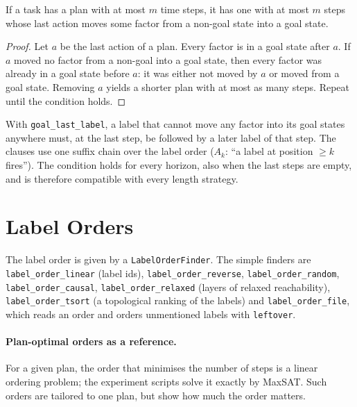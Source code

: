 \documentclass[manuscript, screen]{jair}
\newcommand{\opt}[1]{\texttt{#1}}
\begin{document}
\begin{proposition}
If a task has a plan with at most $m$ time steps, it has one with at most $m$ steps whose last
action moves some factor from a non-goal state into a goal state.
\end{proposition}
\begin{proof}
Let $a$ be the last action of a plan. Every factor is in a goal state after $a$. If $a$ moved no
factor from a non-goal into a goal state, then every factor was already in a goal state before $a$:
it was either not moved by $a$ or moved from a goal state. Removing $a$ yields a shorter plan with
at most as many steps. Repeat until the condition holds.
\end{proof}
With \opt{goal\_last\_label}, a label that cannot move any factor into its goal states anywhere must,
at the last step, be followed by a later label of that step. The clauses use one suffix chain over
the label order ($A_k$: ``a label at position $\geq k$ fires''). The condition holds for every
horizon, also when the last steps are empty, and is therefore compatible with every length strategy.

\section{Label Orders}\label{sec:orders}

The label order is given by a \opt{LabelOrderFinder}. The simple finders are \opt{label\_order\_linear}
(label ids), \opt{label\_order\_reverse}, \opt{label\_order\_random}, \opt{label\_order\_causal},
\opt{label\_order\_relaxed} (layers of relaxed reachability), \opt{label\_order\_tsort} (a topological
ranking of the labels) and \opt{label\_order\_file}, which reads an order
and orders unmentioned labels with \opt{leftover}.

\paragraph{Plan-optimal orders as a reference.} For a given plan, the order that minimises the number
of steps is a linear ordering problem; the experiment scripts solve it exactly by MaxSAT. Such orders
are tailored to one plan, but show how much the order matters.
\end{document}
